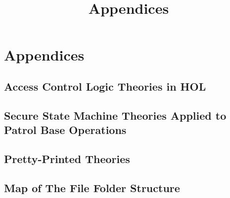 \documentclass[../main/main.tex]{subfiles}
\begin{document}
\title{Appendices}

\chapter{Appendices}
\appendix
\section{Access Control Logic Theories in HOL}
\section{Secure State Machine Theories Applied to Patrol Base Operations}
\section{Pretty-Printed Theories}
\section{Map of The File Folder Structure}
\end{document}
